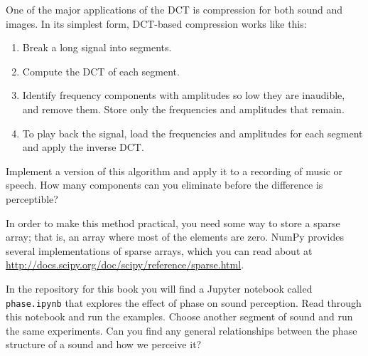 \begin{exercise}
	One of the major applications of the DCT is compression for both
	sound and images.  In its simplest form, DCT-based compression
	works like this:
	
	\begin{enumerate}
		
		\item Break a long signal into segments.
		
		\item Compute the DCT of each segment.
		
		\item Identify frequency components with amplitudes so low they are
		inaudible, and remove them.  Store only the frequencies and
		amplitudes that remain.
		
		\item To play back the signal, load the frequencies and amplitudes
		for each segment and apply the inverse DCT.
		
	\end{enumerate}
	
	Implement a version of this algorithm and apply it to a recording
	of music or speech.  How many components can you eliminate before
	the difference is perceptible?
	
	In order to make this method practical, you need some way to store a
	sparse array; that is, an array where most of the elements are zero.
	NumPy provides several implementations of sparse arrays, which you can
	read about at
	\url{http://docs.scipy.org/doc/scipy/reference/sparse.html}.
\end{exercise}


\begin{exercise}
	In the repository for this book you will find a Jupyter notebook
	called \verb"phase.ipynb" that explores the effect of phase on sound
	perception.
	Read through this notebook and run the examples.
	Choose another segment of sound and run the same experiments.
	Can you find any general relationships between the phase structure
	of a sound and how we perceive it?
\end{exercise}